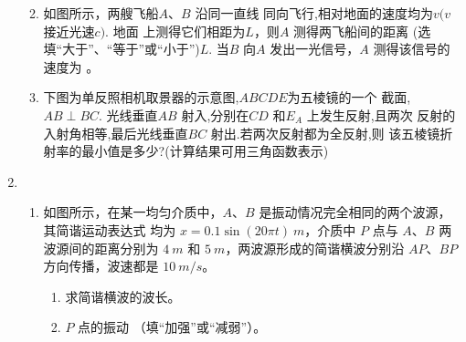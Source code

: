 \begin{enumerate}
\begin{enumerate}

\item 
如图所示，两艘飞船$ A $、$ B $ 沿同一直线
同向飞行,相对地面的速度均为$ v(v $ 接近光速$ c) $. 地面
上测得它们相距为$ L $，则$ A $ 测得两飞船间的距离
 \underlinegap  (选填“大于”、“等于”或“小于”)$ L $. 当$ B $ 向$ A $ 发出一光信号，$ A $ 测得该信号的速度为 \underlinegap 。
\begin{figure}[h!]
	\centering
	
\end{figure}



\item 
下图为单反照相机取景器的示意图,$ ABCDE $为五棱镜的一个
截面,$ AB \perp BC $. 光线垂直$ AB $ 射入,分别在$ CD $ 和$ E_{A} $ 上发生反射,且两次
反射的入射角相等,最后光线垂直$ BC $ 射出.若两次反射都为全反射,则
该五棱镜折射率的最小值是多少?(计算结果可用三角函数表示)
\begin{figure}[h!]
	\flushright
	
\end{figure}



	
\end{enumerate}



\item 
{}
\begin{enumerate}
	\item
如图所示，在某一均匀介质中，$ A $、$ B $ 是振动情况完全相同的两个波源，其简谐运动表达式
均为 $ x=0.1 \sin (20 \pi t) \ m $，介质中 $ P $ 点与 $ A $、$ B $ 两波源间的距离分别为 $ 4 \ m $ 和
$ 5 \ m $，两波源形成的简谐横波分别沿 $ AP $、$ BP $ 方向传播，波速都是 $ 10 \ m /s $。
\begin{enumerate}
	\item
求简谐横波的波长。
\item 
$ P $ 点的振动 \underlinegap （填“加强”或“减弱”）。
\end{enumerate}
\begin{figure}[h!]
	\flushright
	
\end{figure}


\end{enumerate}
\end{enumerate}
